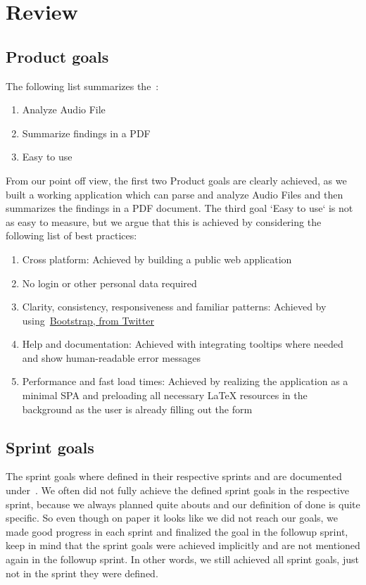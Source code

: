 \section{Review}\label{sec:review}

\subsection{Product goals}\label{subsec:product-goals-review}
The following list summarizes the~:

\begin{enumerate}
    \item Analyze Audio File
    \item Summarize findings in a PDF
    \item Easy to use
\end{enumerate}

From our point off view, the first two Product goals are clearly achieved, as we built a working application
which can parse and analyze Audio Files and then summarizes the findings in a PDF document.
The third goal `Easy to use` is not as easy to measure, but we argue that this is achieved by considering the following
list of best practices:

\begin{enumerate}
    \item Cross platform: Achieved by building a public web application
    \item No login or other personal data required
    \item Clarity, consistency, responsiveness and familiar patterns: Achieved by using~\href{https://getbootstrap.com/2.0.2/}{Bootstrap, from Twitter}
    \item Help and documentation: Achieved with integrating tooltips where needed and show human-readable error messages
    \item Performance and fast load times: Achieved by realizing the application as a minimal SPA and preloading all necessary LaTeX resources in the background as the user is already filling out the form
\end{enumerate}

\subsection{Sprint goals}\label{subsec:sprint-goals-review}
The sprint goals where defined in their respective sprints and are documented under~.
We often did not fully achieve the defined sprint goals in the respective sprint,
because we always planned quite abouts and our definition of done is quite specific.
So even though on paper it looks like we did not reach our goals, we made good progress in each sprint and finalized the
goal in the followup sprint, keep in mind that the sprint goals were achieved implicitly and are not mentioned again
in the followup sprint.
In other words, we still achieved all sprint goals, just not in the sprint they were defined.


